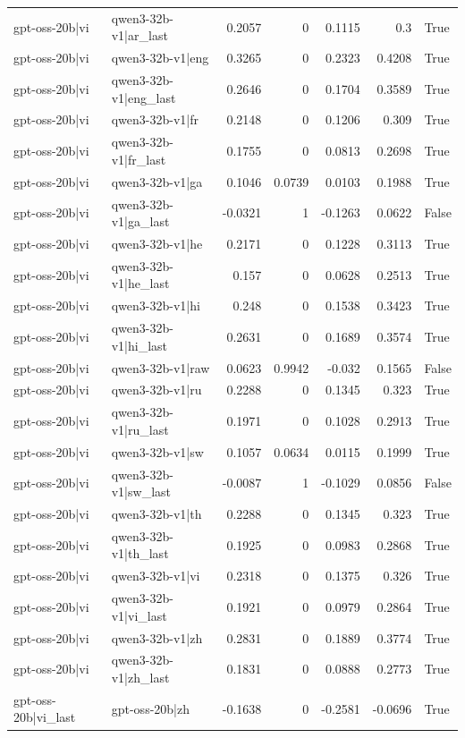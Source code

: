 \begin{table}
\begin{tabular}{l l r r r r l}
gpt-oss-20b|vi & qwen3-32b-v1|ar_last & 0.2057 & 0 & 0.1115 & 0.3 & True \\
gpt-oss-20b|vi & qwen3-32b-v1|eng & 0.3265 & 0 & 0.2323 & 0.4208 & True \\
gpt-oss-20b|vi & qwen3-32b-v1|eng_last & 0.2646 & 0 & 0.1704 & 0.3589 & True \\
gpt-oss-20b|vi & qwen3-32b-v1|fr & 0.2148 & 0 & 0.1206 & 0.309 & True \\
gpt-oss-20b|vi & qwen3-32b-v1|fr_last & 0.1755 & 0 & 0.0813 & 0.2698 & True \\
gpt-oss-20b|vi & qwen3-32b-v1|ga & 0.1046 & 0.0739 & 0.0103 & 0.1988 & True \\
gpt-oss-20b|vi & qwen3-32b-v1|ga_last & -0.0321 & 1 & -0.1263 & 0.0622 & False \\
gpt-oss-20b|vi & qwen3-32b-v1|he & 0.2171 & 0 & 0.1228 & 0.3113 & True \\
gpt-oss-20b|vi & qwen3-32b-v1|he_last & 0.157 & 0 & 0.0628 & 0.2513 & True \\
gpt-oss-20b|vi & qwen3-32b-v1|hi & 0.248 & 0 & 0.1538 & 0.3423 & True \\
gpt-oss-20b|vi & qwen3-32b-v1|hi_last & 0.2631 & 0 & 0.1689 & 0.3574 & True \\
gpt-oss-20b|vi & qwen3-32b-v1|raw & 0.0623 & 0.9942 & -0.032 & 0.1565 & False \\
gpt-oss-20b|vi & qwen3-32b-v1|ru & 0.2288 & 0 & 0.1345 & 0.323 & True \\
gpt-oss-20b|vi & qwen3-32b-v1|ru_last & 0.1971 & 0 & 0.1028 & 0.2913 & True \\
gpt-oss-20b|vi & qwen3-32b-v1|sw & 0.1057 & 0.0634 & 0.0115 & 0.1999 & True \\
gpt-oss-20b|vi & qwen3-32b-v1|sw_last & -0.0087 & 1 & -0.1029 & 0.0856 & False \\
gpt-oss-20b|vi & qwen3-32b-v1|th & 0.2288 & 0 & 0.1345 & 0.323 & True \\
gpt-oss-20b|vi & qwen3-32b-v1|th_last & 0.1925 & 0 & 0.0983 & 0.2868 & True \\
gpt-oss-20b|vi & qwen3-32b-v1|vi & 0.2318 & 0 & 0.1375 & 0.326 & True \\
gpt-oss-20b|vi & qwen3-32b-v1|vi_last & 0.1921 & 0 & 0.0979 & 0.2864 & True \\
gpt-oss-20b|vi & qwen3-32b-v1|zh & 0.2831 & 0 & 0.1889 & 0.3774 & True \\
gpt-oss-20b|vi & qwen3-32b-v1|zh_last & 0.1831 & 0 & 0.0888 & 0.2773 & True \\
gpt-oss-20b|vi_last & gpt-oss-20b|zh & -0.1638 & 0 & -0.2581 & -0.0696 & True \\

\end{tabular}
\end{table}
